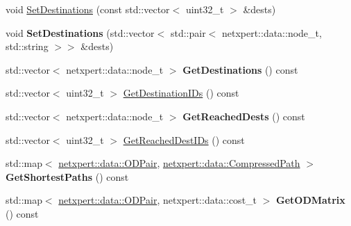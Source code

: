 \begin{DoxyCompactItemize}
\item 
void \hyperlink{classnetxpert_1_1OriginDestinationMatrix_ac0ae25a4fd186aeee1ce7c1b50538a62}{Set\+Destinations} (const std\+::vector$<$ uint32\+\_\+t $>$ \&dests)
\item 
void {\bfseries Set\+Destinations} (std\+::vector$<$ std\+::pair$<$ netxpert\+::data\+::node\+\_\+t, std\+::string $>$$>$ \&dests)\hypertarget{classnetxpert_1_1OriginDestinationMatrix_a05b29c743df9d1d9002d682e47c791ba}{}\label{classnetxpert_1_1OriginDestinationMatrix_a05b29c743df9d1d9002d682e47c791ba}

\item 
std\+::vector$<$ netxpert\+::data\+::node\+\_\+t $>$ {\bfseries Get\+Destinations} () const \hypertarget{classnetxpert_1_1OriginDestinationMatrix_aee97b176bc22b67dc3381af2a858be74}{}\label{classnetxpert_1_1OriginDestinationMatrix_aee97b176bc22b67dc3381af2a858be74}

\item 
std\+::vector$<$ uint32\+\_\+t $>$ \hyperlink{classnetxpert_1_1OriginDestinationMatrix_a92652a2389da24d35f6f1233a1298f91}{Get\+Destination\+I\+Ds} () const 
\item 
std\+::vector$<$ netxpert\+::data\+::node\+\_\+t $>$ {\bfseries Get\+Reached\+Dests} () const \hypertarget{classnetxpert_1_1OriginDestinationMatrix_abdcfabcf36cc23240bd13ed0a021704d}{}\label{classnetxpert_1_1OriginDestinationMatrix_abdcfabcf36cc23240bd13ed0a021704d}

\item 
std\+::vector$<$ uint32\+\_\+t $>$ \hyperlink{classnetxpert_1_1OriginDestinationMatrix_ad7850510d0b31ae9b9d80e795be83756}{Get\+Reached\+Dest\+I\+Ds} () const 
\item 
std\+::map$<$ \hyperlink{structnetxpert_1_1data_1_1ODPair}{netxpert\+::data\+::\+O\+D\+Pair}, \hyperlink{namespacenetxpert_1_1data_a82e488b55f222a9759d73e24f6087033}{netxpert\+::data\+::\+Compressed\+Path} $>$ {\bfseries Get\+Shortest\+Paths} () const \hypertarget{classnetxpert_1_1OriginDestinationMatrix_a0685f3a1113698381631ab37b71fa0ba}{}\label{classnetxpert_1_1OriginDestinationMatrix_a0685f3a1113698381631ab37b71fa0ba}

\item 
std\+::map$<$ \hyperlink{structnetxpert_1_1data_1_1ODPair}{netxpert\+::data\+::\+O\+D\+Pair}, netxpert\+::data\+::cost\+\_\+t $>$ {\bfseries Get\+O\+D\+Matrix} () const \hypertarget{classnetxpert_1_1OriginDestinationMatrix_a7fa514c840cda5d6e8c076b15dc807e6}{}\label{classnetxpert_1_1OriginDestinationMatrix_a7fa514c840cda5d6e8c076b15dc807e6}


\end{DoxyCompactItemize}
